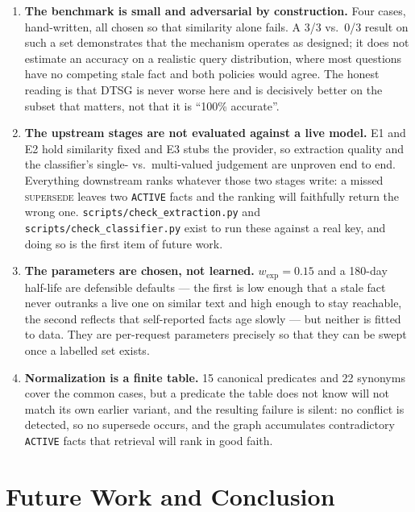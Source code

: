 \documentclass[11pt,a4paper]{article}
\begin{document}
\begin{enumerate}
  \item \textbf{The benchmark is small and adversarial by construction.} Four
        cases, hand-written, all chosen so that similarity alone fails. A 3/3
        vs.\ 0/3 result on such a set demonstrates that the mechanism operates
        as designed; it does not estimate an accuracy on a realistic query
        distribution, where most questions have no competing stale fact and both
        policies would agree. The honest reading is that DTSG is never worse
        here and is decisively better on the subset that matters, not that it is
        ``100\% accurate''.
  \item \textbf{The upstream stages are not evaluated against a live model.}
        E1 and E2 hold similarity fixed and E3 stubs the provider, so extraction
        quality and the classifier's single- vs.\ multi-valued judgement are
        unproven end to end. Everything downstream ranks whatever those two
        stages write: a missed \textsc{supersede} leaves two \texttt{ACTIVE}
        facts and the ranking will faithfully return the wrong one.
        \texttt{scripts/check\_extraction.py} and
        \texttt{scripts/check\_classifier.py} exist to run these against a real
        key, and doing so is the first item of future work.
  \item \textbf{The parameters are chosen, not learned.} $w_{\text{exp}} = 0.15$
        and a 180-day half-life are defensible defaults --- the first is low
        enough that a stale fact never outranks a live one on similar text and
        high enough to stay reachable, the second reflects that self-reported
        facts age slowly --- but neither is fitted to data. They are per-request
        parameters precisely so that they can be swept once a labelled set
        exists.
  \item \textbf{Normalization is a finite table.} 15 canonical predicates and 22
        synonyms cover the common cases, but a predicate the table does not know
        will not match its own earlier variant, and the resulting failure is
        silent: no conflict is detected, so no supersede occurs, and the graph
        accumulates contradictory \texttt{ACTIVE} facts that retrieval will
        rank in good faith.
\end{enumerate}

\section{Future Work and Conclusion}
\label{sec:conclusion}
\end{document}
